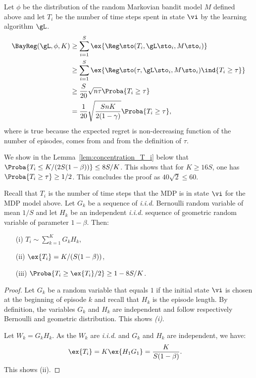 \begin{subappendices}
Let $\phi$ be the distribution of the random Markovian bandit model $M$ defined above and let $T_i$ be the number of time steps spent in state $\vi$ by the learning algorithm $\gL$.
\begin{align}
    \BayReg(\gL, \phi, K)
    &\ge \sum_{i=1}^S\ex{\Reg\sto(T_i, \gL\sto_i, M\sto_i)} \nonumber\\
    &\ge \sum_{i=1}^S\ex{\Reg\sto(\tau, \gL\sto_i,  M\sto_i)\ind{T_i\ge\tau}}\label{eq:non-decreasing}\\
    &\ge \frac{S}{20} \sqrt{n\tau}\Proba{T_i\ge \tau}\label{eq:lower2}\\
    &= \frac1{20} \sqrt{\frac{SnK}{2(1-\gamma)}}\Proba{T_i\ge \tau},\label{eq:tau}
\end{align}
where  is true because the expected regret is non-decreasing function of the number of episodes,  comes from  and  from the definition of $\tau$.

We show in the Lemma~\ref{lem:concentration_T_i} below that $\Proba{T_i\le K/(2S(1-\beta))}\le 8S/K$. This shows that for $K\ge16S$, one has $\Proba{T_i\ge \tau}\ge1/2$. This concludes the proof as $40\sqrt{2}\le60$. 

\begin{lem}
    \label{lem:concentration_T_i}
    Recall that $T_i$ is the number of time steps that the MDP is in state $\vi$ for the MDP model above. Let $G_k$ be a sequence of \emph{i.i.d.} Bernoulli random variable of mean $1/S$ and let $H_k$ be an independent \emph{i.i.d.} sequence of geometric random variable of parameter $1-\beta$. Then:
    \begin{itemize}
        \item[(i)] $T_i\sim\sum_{k=1}^K G_k H_k$,
        \item[(ii)] $\ex{T_i} = K/(S(1-\beta))$,
        \item[(iii)] $\Proba{T_i \ge \ex{T_i}/2} \ge 1-8S/K$. 
    \end{itemize}
\end{lem}
\begin{proof}
    Let $G_k$ be a random variable that equals $1$ if the initial state $\vi$ is chosen at the beginning of episode $k$ and recall that $H_k$ is the episode length. By definition, the variables $G_k$ and $H_k$ are independent and follow respectively Bernoulli and geometric distribution. This shows \emph{(i)}. 
    
    Let $W_k=G_kH_k$. As the $W_k$ are \emph{i.i.d.} and $G_k$ and $H_k$ are independent, we have: 
    \begin{align*}
        \ex{T_i} = K\ex{H_1G_1} &= \frac{K}{S(1-\beta)}.
    \end{align*}
    This shows (ii). 
    

\end{proof}
\end{subappendices}
